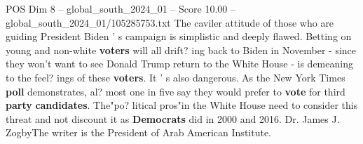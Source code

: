 \begin{textsample}{POS Dim 8 – global\_south\_2024\_01 – Score 10.00 – global\_south\_2024\_01/105285753.txt}
The caviler attitude of those who are guiding President Biden ' s campaign is simplistic and deeply flawed.
Betting on young and non-white \textbf{voters} will all drift? ing back to Biden in November - since they won't want to see Donald Trump return to the White House - is demeaning to the feel? ings of these \textbf{voters}.
It ' s also dangerous.
As the New York Times \textbf{poll} demonstrates, al? most one in five say they would prefer to \textbf{vote} for third \textbf{party} \textbf{candidates}.
The"po? litical pros"in the White House need to consider this threat and not discount it as \textbf{Democrats} did in 2000 and 2016.
Dr.
James J.
ZogbyThe writer is the President of Arab American Institute.

\end{textsample}

